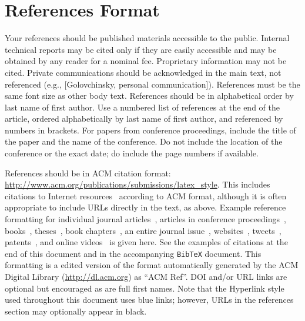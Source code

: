 \documentclass{sigchi-ext}
\begin{document}
\section{References Format}
Your references should be published materials accessible to the
public. Internal technical reports may be cited only if they are
easily accessible and may be obtained by any reader for a nominal
fee. Proprietary information may not be cited. Private communications
should be acknowledged in the main text, not referenced (e.g.,
[Golovchinsky, personal communication]). References must be the same
font size as other body text. References should be in alphabetical
order by last name of first author. Use a numbered list of references
at the end of the article, ordered alphabetically by last name of
first author, and referenced by numbers in brackets. For papers from
conference proceedings, include the title of the paper and the name of
the conference. Do not include the location of the conference or the
exact date; do include the page numbers if available. 

References should be in ACM citation format:
\url{http://www.acm.org/publications/submissions/latex_style}.  This
includes citations to Internet
resources~\cite{CHINOSAUR:venue,cavender:writing,psy:gangnam}
according to ACM format, although it is often appropriate to include
URLs directly in the text, as above. Example reference formatting for
individual journal articles~\cite{ethics}, articles in conference
proceedings~\cite{Klemmer:2002:WSC:503376.503378},
books~\cite{Schwartz:1995:GBF}, theses~\cite{sutherland:sketchpad},
book chapters~\cite{winner:politics}, an entire journal
issue~\cite{kaye:puc},
websites~\cite{acm_categories,cavender:writing},
tweets~\cite{CHINOSAUR:venue}, patents~\cite{heilig:sensorama}, and
online videos~\cite{psy:gangnam} is given here.  See the examples of
citations at the end of this document and in the accompanying
\texttt{BibTeX} document. This formatting is a edited version of the
format automatically generated by the ACM Digital Library
(\url{http://dl.acm.org}) as ``ACM Ref''. DOI and/or URL links are
optional but encouraged as are full first names. Note that the
Hyperlink style used throughout this document uses blue links;
however, URLs in the references section may optionally appear in
black.

\balance{} 



\end{document}
